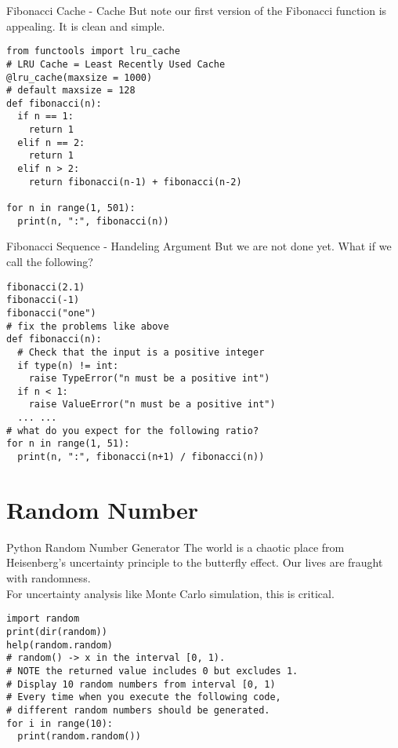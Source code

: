 \documentclass{beamer}
\begin{document}
\begin{frame}[fragile]{Fibonacci Cache - Cache} \vspace{1em}
But note our first version of the Fibonacci function is appealing.
It is clean and simple.
\begin{verbatim}
from functools import lru_cache
# LRU Cache = Least Recently Used Cache
@lru_cache(maxsize = 1000)
# default maxsize = 128
def fibonacci(n):
  if n == 1:
    return 1
  elif n == 2:
    return 1
  elif n > 2:
    return fibonacci(n-1) + fibonacci(n-2)

for n in range(1, 501):
  print(n, ":", fibonacci(n))
\end{verbatim}
\end{frame}

\begin{frame}[fragile]{Fibonacci Sequence - Handeling Argument} \vspace{1em}
But we are not done yet. What if we call the following? \vspace{-.5em}
\begin{verbatim}
fibonacci(2.1)
fibonacci(-1)
fibonacci("one")
# fix the problems like above
def fibonacci(n):
  # Check that the input is a positive integer
  if type(n) != int:
    raise TypeError("n must be a positive int")
  if n < 1:
    raise ValueError("n must be a positive int")
  ... ...
# what do you expect for the following ratio?
for n in range(1, 51):
  print(n, ":", fibonacci(n+1) / fibonacci(n))
\end{verbatim}
\end{frame}

\section{Random Number}

\begin{frame}[fragile]{Python Random Number Generator} \vspace{1em}
The world is a chaotic place from Heisenberg's uncertainty principle
to the butterfly effect. Our lives are fraught with randomness.\\
For uncertainty analysis like Monte Carlo simulation, this is
critical.
\begin{verbatim}
import random
print(dir(random))
help(random.random)
# random() -> x in the interval [0, 1).
# NOTE the returned value includes 0 but excludes 1.
# Display 10 random numbers from interval [0, 1)
# Every time when you execute the following code,
# different random numbers should be generated.
for i in range(10):
  print(random.random())
\end{verbatim}
\end{frame}
\end{document}
